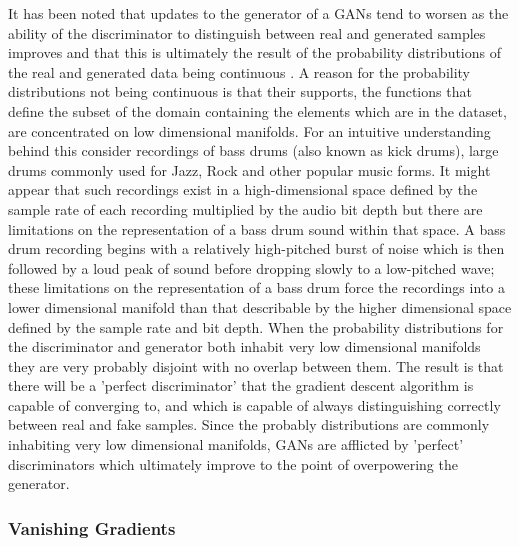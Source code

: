 \documentclass[a4paper, titlepage]{article}
\begin{document}
It has been noted that updates to the generator of a \ac{GAN}s tend to worsen as the ability of the discriminator to distinguish between real and generated samples improves and that this is ultimately the result of the probability distributions of the real and generated data being continuous \citep{2017arXiv170104862A}.
A reason for the probability distributions not being continuous is that their supports, the functions that define the subset of the domain containing the elements which are in the dataset, are concentrated on low dimensional manifolds.
\newline
\newline
For an intuitive understanding behind this consider recordings of bass drums (also known as kick drums), large drums commonly used for Jazz, Rock and other popular music forms.
It might appear that such recordings exist in a high-dimensional space defined by the sample rate of each recording multiplied by the audio bit depth but there are limitations on the representation of a bass drum sound within that space.
\newline
\newline
A bass drum recording begins with a relatively high-pitched burst of noise which is then followed by a loud peak of sound before dropping slowly to a low-pitched wave; these limitations on the representation of a bass drum force the recordings into a lower dimensional manifold than that describable by the higher dimensional space defined by the sample rate and bit depth.
\newline
\newline
When the probability distributions for the discriminator and generator both inhabit very low dimensional manifolds they are very probably disjoint with no overlap between them.
The result is that there will be a 'perfect discriminator' that the gradient descent algorithm is capable of converging to, and which is capable of always distinguishing correctly between real and fake samples.
Since the probably distributions are commonly inhabiting very low dimensional manifolds, \ac{GAN}s are afflicted by 'perfect' discriminators which ultimately improve to the point of overpowering the generator.

\subsubsection{Vanishing Gradients}
\end{document}
